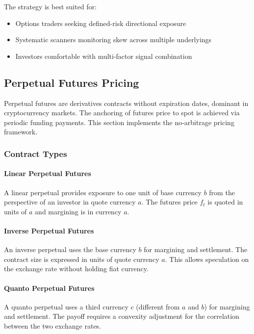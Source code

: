 The strategy is best suited for:
\begin{itemize}
  \item Options traders seeking defined-risk directional exposure
  \item Systematic scanners monitoring skew across multiple underlyings
  \item Investors comfortable with multi-factor signal combination
\end{itemize}

\subsection{Perpetual Futures Pricing}

Perpetual futures are derivatives contracts without expiration dates, dominant in cryptocurrency markets. The anchoring of futures price to spot is achieved via periodic funding payments. This section implements the no-arbitrage pricing framework.

\subsubsection{Contract Types}

\paragraph{Linear Perpetual Futures}

A linear perpetual provides exposure to one unit of base currency $b$ from the perspective of an investor in quote currency $a$. The futures price $f_t$ is quoted in units of $a$ and margining is in currency $a$.

\paragraph{Inverse Perpetual Futures}

An inverse perpetual uses the base currency $b$ for margining and settlement. The contract size is expressed in units of quote currency $a$. This allows speculation on the exchange rate without holding fiat currency.

\paragraph{Quanto Perpetual Futures}

A quanto perpetual uses a third currency $c$ (different from $a$ and $b$) for margining and settlement. The payoff requires a convexity adjustment for the correlation between the two exchange rates.

